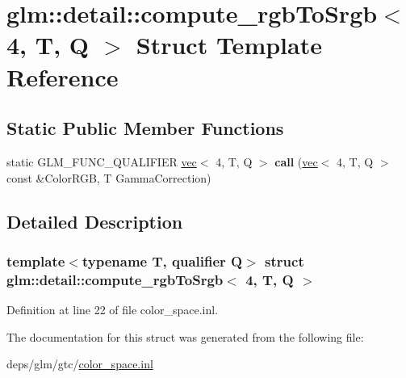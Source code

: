\hypertarget{structglm_1_1detail_1_1compute__rgbToSrgb_3_014_00_01T_00_01Q_01_4}{}\section{glm\+:\+:detail\+:\+:compute\+\_\+rgb\+To\+Srgb$<$ 4, T, Q $>$ Struct Template Reference}
\label{structglm_1_1detail_1_1compute__rgbToSrgb_3_014_00_01T_00_01Q_01_4}
\subsection*{Static Public Member Functions}
\begin{DoxyCompactItemize}
\item 
\mbox{\label{structglm_1_1detail_1_1compute__rgbToSrgb_3_014_00_01T_00_01Q_01_4_aedf4da586350c728943a249325c9d9c9}} 
static G\+L\+M\+\_\+\+F\+U\+N\+C\+\_\+\+Q\+U\+A\+L\+I\+F\+I\+ER \hyperlink{structglm_1_1vec}{vec}$<$ 4, T, Q $>$ {\bfseries call} (\hyperlink{structglm_1_1vec}{vec}$<$ 4, T, Q $>$ const \&Color\+R\+GB, T Gamma\+Correction)
\end{DoxyCompactItemize}


\subsection{Detailed Description}
\subsubsection*{template$<$typename T, qualifier Q$>$\newline
struct glm\+::detail\+::compute\+\_\+rgb\+To\+Srgb$<$ 4, T, Q $>$}



Definition at line 22 of file color\+\_\+space.\+inl.



The documentation for this struct was generated from the following file\+:\begin{DoxyCompactItemize}
\item 
deps/glm/gtc/\hyperlink{gtc_2color__space_8inl}{color\+\_\+space.\+inl}\end{DoxyCompactItemize}

